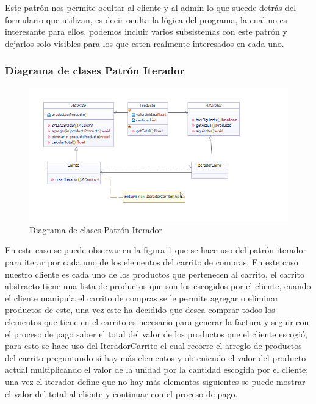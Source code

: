 Este patrón nos permite ocultar al cliente y al admin lo que sucede detrás del formulario que utilizan, es decir oculta la lógica del programa, la cual no es interesante para ellos, podemos incluir varios subsistemas con este patrón y dejarlos solo visibles para los que esten realmente interesados en cada uno. 

\subsubsection*{Diagrama de clases Patrón Iterador}

\begin{figure}[th!]
	\centering
	\includegraphics[width=0.9\linewidth]{arquitectura/imagenes/DiagramaIterador}
	\caption{Diagrama de clases Patrón Iterador}
	\label{fig:patronIterador2}
\end{figure}

En este caso se puede observar en la figura \ref{fig:patronIterador2} que se hace uso del patrón iterador para iterar por cada uno de los elementos del carrito de compras. En este caso nuestro cliente es cada uno de los productos que pertenecen al carrito, el carrito abstracto tiene una lista de productos que son los escogidos por el cliente, cuando el cliente manipula el carrito de compras se le permite agregar o eliminar productos de este, una vez este ha decidido que desea comprar todos los elementos que tiene en el carrito es necesario para generar la factura y seguir con el proceso de pago saber el total del valor de los productos que el cliente escogió, para esto se hace uso del IteradorCarrito  el cual recorre el arreglo de productos del carrito preguntando si hay más elementos y obteniendo el valor del producto actual multiplicando el valor de la unidad por la cantidad escogida por el cliente; una vez el iterador define que no hay más elementos siguientes se puede mostrar el valor del total al cliente y continuar con el proceso de pago.

